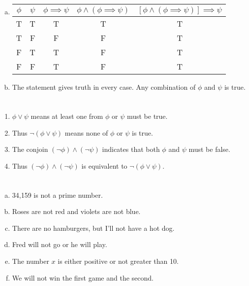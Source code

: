 \documentclass{article}
\begin{document}
\section{}

\begin{enumerate}[(a)]
\item
  \begin{tabular}{ | c | c | c | c | c | }
    \hline
    $\phi$ & $\psi$ & $\phi \implies \psi$ & $\phi \wedge (\phi \implies \psi)$ & $[\phi \wedge (\phi \implies \psi)] \implies \psi$ \\
    \hline
    T & T & T & T & T \\
    T & F & F & F & T \\
    F & T & T & F & T \\
    F & F & T & F & T \\
    \hline
  \end{tabular}
\item
  The statement gives truth in every case. Any combination of $\phi$ and $\psi$ is true.
\end{enumerate}

\section{}

\begin{enumerate}
\item $\phi \vee \psi$ means at least one from $\phi$ or $\psi$ must be true.
\item Thus $\neg(\phi \vee \psi)$ means none of $\phi$ or $\psi$ is true.
\item The conjoin $(\neg\phi) \wedge (\neg\psi)$ indicates that both $\phi$ and
  $\psi$ must be false.
\item Thus $(\neg\phi) \wedge (\neg\psi)$ is equivalent to $\neg(\phi \vee \psi)$.
\end{enumerate}

\section{}

\begin{enumerate}[(a)]
\item 34,159 is not a prime number.
\item Roses are not red and violets are not blue.
\item There are no hamburgers, but I'll not have a hot dog.
\item Fred will not go or he will play.
\item The number $x$ is either positive or not greater than 10.
\item We will not win the first game and the second.
\end{enumerate}
\end{document}

